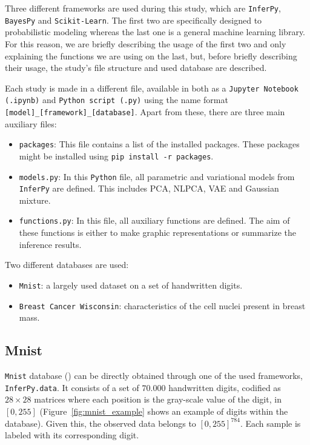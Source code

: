 
Three different frameworks are used during this study, which are \texttt{InferPy}, \texttt{BayesPy} and \texttt{Scikit-Learn}. The first two are specifically designed to probabilistic modeling whereas the last one is a general machine learning library. For this reason, we are briefly describing the usage of the first two and only explaining the functions we are using on the last, but, before briefly describing their usage, the study's file structure and used database are described.

Each study is made in a different file, available in both as a \texttt{Jupyter Notebook (.ipynb)} and \texttt{Python script (.py)} using the name format \texttt{[model]\_[framework]\_[database]}. Apart from these, there are three main auxiliary files:

\begin{itemize}
  \item \texttt{packages}: This file contains a list of the installed packages. These packages might be installed using \texttt{pip install -r packages}.
  \item \texttt{models.py}: In this \texttt{Python} file, all parametric and variational models from \texttt{InferPy} are defined. This includes PCA, NLPCA, VAE and Gaussian mixture.
  \item \texttt{functions.py}: In this file, all auxiliary functions are defined. The aim of these functions is either to make graphic representations or summarize the inference results.
\end{itemize}

Two different databases are used:
\begin{itemize}
  \item \texttt{Mnist}: a largely used dataset on a set of handwritten digits.
  \item \texttt{Breast Cancer Wisconsin}: characteristics of the cell nuclei present in breast mass.
\end{itemize}

\subsection{Mnist}

\texttt{Mnist} database (\cite{lecun-mnisthandwrittendigit-2010}) can be directly obtained through one of the used frameworks, \texttt{InferPy.data}. It consists of a set of \(70.000\)  handwritten digits, codified as \(28\times 28\) matrices where each position is the gray-scale value of the digit, in \([0,255]\)  (Figure~\ref{fig:mnist_example} shows an example of digits within the database). Given this, the observed data belongs to \([0, 255]^{784}\). Each sample is labeled with its corresponding digit.

